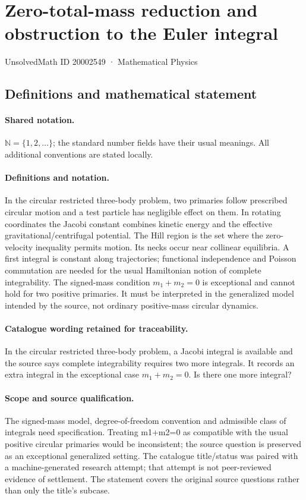\documentclass[11pt]{article}
\begin{document}
\setcounter{section}{20002548}
\section{Zero-total-mass reduction and obstruction to the Euler integral}\label{20002549}
{\small UnsolvedMath ID 20002549 · Mathematical Physics}
\subsection{Definitions and mathematical statement}

\paragraph{Shared notation.}$\mathbb N=\{1,2,\ldots\}$; the standard number fields have their usual meanings. All additional conventions are stated locally.


\paragraph{Definitions and notation.}In the circular restricted three-body problem, two primaries follow prescribed circular motion and a test particle has negligible effect on them. In rotating coordinates the Jacobi constant combines kinetic energy and the effective gravitational/centrifugal potential. The Hill region is the set where the zero-velocity inequality permits motion. Its necks occur near collinear equilibria. A first integral is constant along trajectories; functional independence and Poisson commutation are needed for the usual Hamiltonian notion of complete integrability. The signed-mass condition $m_1+m_2=0$ is exceptional and cannot hold for two positive primaries. It must be interpreted in the generalized model intended by the source, not ordinary positive-mass circular dynamics.

\paragraph{Catalogue wording retained for traceability.}
In the circular restricted three-body problem, a Jacobi integral is available and the source says complete integrability requires two more integrals. It records an extra integral in the exceptional case $m_1+m_2=0$. Is there one more integral?
\paragraph{Scope and source qualification.}The signed-mass model, degree-of-freedom convention and admissible class of integrals need specification. Treating m1+m2=0 as compatible with the usual positive circular primaries would be inconsistent; the source question is preserved as an exceptional generalized setting. The catalogue title/status was paired with a machine-generated research attempt; that attempt is not peer-reviewed evidence of settlement. The statement covers the original source questions rather than only the title’s subcase.
\end{document}
